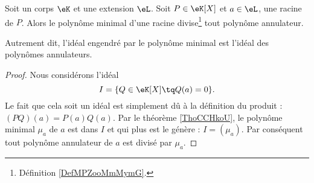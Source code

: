 \begin{proposition}\label{PropXULooPCusvE}
    Soit un corps \( \eK\) et une extension \( \eL\). Soit \( P\in \eK[X]\) et  \( a\in \eL\), une racine de \( P\). Alors le polynôme minimal d'une racine divise\footnote{Définition \ref{DefMPZooMmMymG}.} tout polynôme annulateur.

    Autrement dit, l'idéal engendré par le polynôme minimal est l'idéal des polynômes annulateurs.
\end{proposition}

\begin{proof}
    Nous considérons l'idéal
    \begin{equation}
        I=\{ Q\in \eK[X]\tq Q(a)=0 \}.
    \end{equation}
    Le fait que cela soit un idéal est simplement dû à la définition du produit : \( (PQ)(a)=P(a)Q(a)\). Par le théorème \ref{ThoCCHkoU}, le polynôme minimal \( \mu_a\) de \( a\) est dans \( I\) et qui plus est le génère : \( I=(\mu_a)\). Par conséquent tout polynôme annulateur de \( a\) est divisé par \( \mu_a\).
\end{proof}

